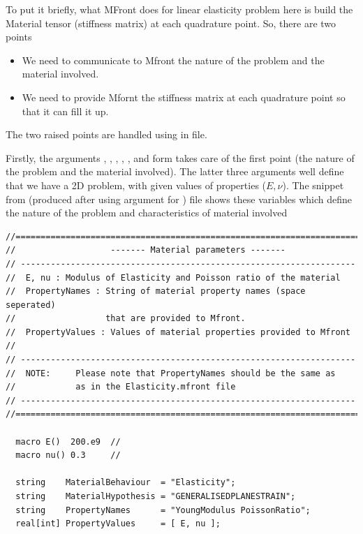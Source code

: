 To put it briefly, what MFront does for linear elasticity problem here
is build the Material tensor (stiffness matrix) at each quadrature
point. So, there are two points

\begin{itemize}
\item We need to communicate to Mfront the nature of the problem and the material involved.
\item We need to provide Mfornt the stiffness matrix at each quadrature point so that it can fill it up.
\end{itemize}

The two raised points are handled using
 in  file.

Firstly, the arguments , ,
,
,
,
 and
 form
 takes care of the first point (the nature of
the problem and the material involved). The latter three arguments well
define that we have a 2D problem, with given values of properties
(\(E, \nu\)). The snippet from  (produced
after using  argument for ) file
shows these variables which define the nature of the problem and
characteristics of material involved

\begin{lstlisting}[style=CppStyle]
//============================================================================
//                   ------- Material parameters -------
// -------------------------------------------------------------------
//  E, nu : Modulus of Elasticity and Poisson ratio of the material
//  PropertyNames : String of material property names (space seperated)
//                  that are provided to Mfront.
//  PropertyValues : Values of material properties provided to Mfront
//
// -------------------------------------------------------------------
//  NOTE:     Please note that PropertyNames should be the same as
//            as in the Elasticity.mfront file
// -------------------------------------------------------------------
//============================================================================

  macro E()  200.e9  //
  macro nu() 0.3     //

  string    MaterialBehaviour  = "Elasticity";
  string    MaterialHypothesis = "GENERALISEDPLANESTRAIN";
  string    PropertyNames      = "YoungModulus PoissonRatio";
  real[int] PropertyValues     = [ E, nu ];
\end{lstlisting}

